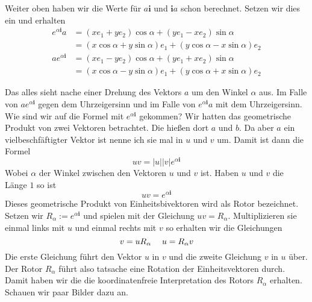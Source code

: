 \documentclass[fleqn]{scrartcl}
\numberwithin{equation}{section}
\def\*#1{\mathbf{#1}}
\begin{document}
Weiter oben haben wir die Werte für $a\*i$ und $\*ia$ schon berechnet. Setzen
wir dies ein und erhalten
\begin{align*}
    e^{\alpha\*i} a &= (xe_1 +ye_2) \cos\alpha + (ye_1 -xe_2) \sin\alpha \\
    &= (x\cos\alpha+y\sin\alpha)e_1 + (y\cos\alpha - x\sin\alpha) e_2 \\
    a e^{\alpha\*i} &= (xe_1 -ye_2)\cos\alpha + (ye_1 + xe_2) \sin\alpha \\
    &= (x\cos\alpha-y\sin\alpha)e_1 + (y\cos\alpha +x\sin\alpha) e_2
\end{align*}

Das alles sieht nache einer Drehung des Vektors $a$ um den Winkel $\alpha$
aus. Im Falle von $ae^{\alpha\*i}$ gegen dem Uhrzeigersinn und im Falle von
$e^{\alpha\*i}a$ mit dem Uhrzeigersinn. Wie sind wir auf die Formel mit
$e^{\alpha\*i}$ gekommen? Wir hatten das geometrische Produkt von zwei
Vektoren betrachtet. Die hießen dort $a$ und $b$. Da aber $a$ ein
vielbeschfäftigter Vektor  ist nenne ich sie mal in $u$ und $v$ um. Damit ist
dann die Formel
\[
    uv=|u||v|e^{\alpha\*i}
\]
Wobei $\alpha$ der Winkel zwischen den Vektoren $u$ und $v$ ist. Haben $u$ und
$v$ die Länge $1$ so ist
\[
    uv=e^{\alpha\*i}
\]
Dieses geometrische Produkt von Einheitsbivektoren wird als Rotor bezeichnet.
Setzen wir $R_\alpha := e^{\alpha\*i}$ und spielen mit der Gleichung
$uv=R_\alpha$.  Multiplizieren sie einmal links mit $u$ und einmal rechts mit
$v$ so erhalten wir die Gleichungen
\[
    v = uR_\alpha\hspace{3ex}u = R_\alpha v
\]
Die erste Gleichung führt den Vektor $u$ in $v$ und die zweite Gleichung $v$
in $u$ über. Der Rotor $R_\alpha$ führt also tatsache eine Rotation der
Einheitsvektoren durch. Damit haben wir die die koordinatenfreie
Interpretation des Rotors $R_\alpha$ erhalten.  Schauen wir paar Bilder dazu
an.
\begin{center}
\begin{minipage}{\linewidth}
\centering
{}
\label{fig:rotatealpha}
\end{minipage}
\end{center}
\end{document}
